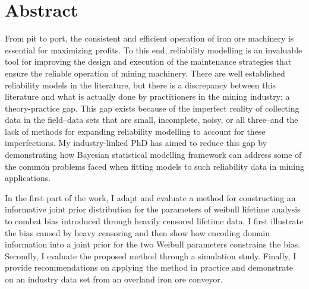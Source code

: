 
\chapter*{Abstract} 

From pit to port, the consistent and efficient operation of iron ore machinery is essential for maximizing profits. 
To this end, reliability modelling is an invaluable tool for improving the design and execution of the maintenance strategies that ensure the reliable operation of mining machinery.
There are well established reliability models in the literature, but there is a discrepancy between this literature and what is actually done by practitioners in the mining industry; a theory-practice gap.
This gap exists because of the imperfect reality of collecting data in the field--data sets that are small, incomplete, noisy, or all three--and the lack of methods for expanding reliability modelling to account for these imperfections.
My industry-linked PhD has aimed to reduce this gap by demonstrating how Bayesian statistical modelling framework can address some of the common problems faced when fitting models to such reliability data in mining applications.


In the first part of the work, I adapt and evaluate a method for constructing an informative joint prior distribution for the parameters of weibull lifetime analysis to combat bias introduced through heavily censored lifetime data.
I first illustrate the bias caused by heavy censoring and then show how encoding domain information into a joint prior for the two Weibull parameters constrains the bias. 
Secondly, I evaluate the proposed method through a simulation study.
Finally, I provide recommendations on applying the method in practice and demonstrate on an industry data set from an overland iron ore conveyor.

